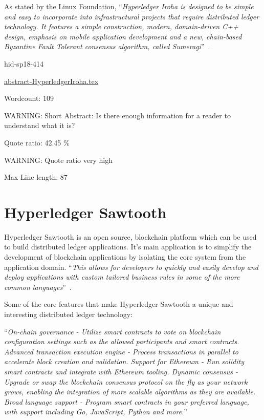 As stated by the Linux Foundation, \color{blue}``\emph{Hyperledger Iroha is designed to
be simple and easy to incorporate into infrastructural projects that
require distributed ledger technology. It features a simple
construction, modern, domain-driven C++ design, emphasis on mobile
application development and a new, chain-based Byzantine Fault
Tolerant consensus algorithm, called 
Sumeragi}''\color{black}~\cite{hid-sp18-414-Active_Status_Iroha}.



\begin{IU}

hid-sp18-414

\href{https://github.com/cloudmesh-community/hid-sp18-414/blob/master//technology/abstract-HyperledgerIroha.tex}{abstract-HyperledgerIroha.tex}

 

Wordcount: 109

WARNING: Short Abstract: Is there enough information for a reader to understand what it is?


Quote ratio: 42.45 \%

WARNING: Quote ratio very high
 
Max Line length: 87
\end{IU}

\section{Hyperledger Sawtooth}

Hyperledger Sawtooth is an open source, blockchain platform which can
be used to build distributed ledger applications. It's main
application is to simplify the development of blockchain applications
by isolating the core system from the application domain. \color{blue}``\emph{This
allows for developers to quickly and easily develop and deploy
applications with custom tailored business rules in some of the more
common languages}''\color{black}~\cite{hid-sp18-414-Hyperledger_Sawtooth}.

Some of the core features that make Hyperledger Sawtooth a unique and
interesting distributed ledger technology:
  
\color{blue}``\emph{On-chain governance - Utilize smart contracts to vote on blockchain
configuration settings such as the allowed participants and smart
contracts.  Advanced transaction execution engine - Process
transactions in parallel to accelerate block creation and validation.
Support for Ethereum - Run solidity smart contracts and integrate with
Ethereum tooling.  Dynamic consensus - Upgrade or swap the blockchain
consensus protocol on the fly as your network grows, enabling the
integration of more scalable algorithms as they are available.  Broad
language support - Program smart contracts in your preferred language,
with support including Go, JavaScript, Python and 
more.}''\color{black}~\cite{hid-sp18-414-Linux_Foundation_Sawtooth}


